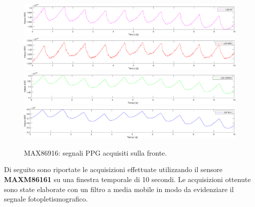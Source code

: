 \begin{figure}[h]
	\centering
	\includegraphics[width=1\linewidth]{ImageFiles/Misure Preliminari/Soggetto 2/max86916/fronte_ired}
	\includegraphics[width=1\linewidth]{ImageFiles/Misure Preliminari/Soggetto 2/max86916/fronte_red}
	\includegraphics[width=1\linewidth]{ImageFiles/Misure Preliminari/Soggetto 2/max86916/fronte_green}
	\includegraphics[width=1\linewidth]{ImageFiles/Misure Preliminari/Soggetto 2/max86916/fronte_blu}
	\caption{MAX86916: segnali PPG acquisiti sulla fronte.}
	\label{fig:soggetto2_MAX86916_fronte}
\end{figure}

\clearpage

Di seguito sono riportate le acquisizioni effettuate utilizzando il sensore \textbf{MAXM86161} su una finestra temporale di 10 secondi. Le acquisizioni ottenute sono state elaborate con un filtro a media mobile in modo da evidenziare il segnale fotopletismografico.

